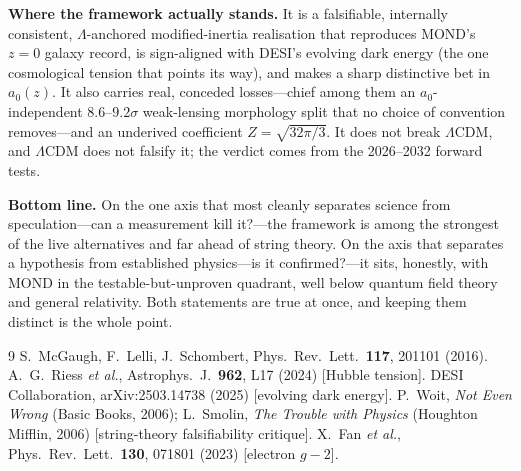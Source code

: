 \documentclass[aps,prd,twocolumn,10pt,nofootinbib]{revtex4-2}
\begin{document}
\textbf{Where the framework actually stands.} It is a falsifiable, internally consistent, $\Lambda$-anchored
modified-inertia realisation that reproduces MOND's $z\!=\!0$ galaxy record, is sign-aligned with DESI's evolving
dark energy (the one cosmological tension that points its way), and makes a sharp distinctive bet in $a_0(z)$. It
also carries real, conceded losses---chief among them an $a_0$-independent $8.6$--$9.2\sigma$ weak-lensing
morphology split that no choice of convention removes---and an underived coefficient $Z=\sqrt{32\pi/3}$. It does not
break $\Lambda$CDM, and $\Lambda$CDM does not falsify it; the verdict comes from the 2026--2032 forward tests.

\textbf{Bottom line.} On the one axis that most cleanly separates science from speculation---can a measurement kill
it?---the framework is among the strongest of the live alternatives and far ahead of string theory. On the axis
that separates a hypothesis from established physics---is it confirmed?---it sits, honestly, with MOND in the
testable-but-unproven quadrant, well below quantum field theory and general relativity. Both statements are true at
once, and keeping them distinct is the whole point.

\begin{thebibliography}{9}
 S.~McGaugh, F.~Lelli, J.~Schombert, Phys.\ Rev.\ Lett.\ \textbf{117}, 201101 (2016).
 A.~G.~Riess \emph{et al.}, Astrophys.\ J.\ \textbf{962}, L17 (2024) [Hubble tension].
 DESI Collaboration, arXiv:2503.14738 (2025) [evolving dark energy].
 P.~Woit, \emph{Not Even Wrong} (Basic Books, 2006); L.~Smolin, \emph{The Trouble with Physics}
(Houghton Mifflin, 2006) [string-theory falsifiability critique].
 X.~Fan \emph{et al.}, Phys.\ Rev.\ Lett.\ \textbf{130}, 071801 (2023) [electron $g\!-\!2$].
\end{thebibliography}
\end{document}
